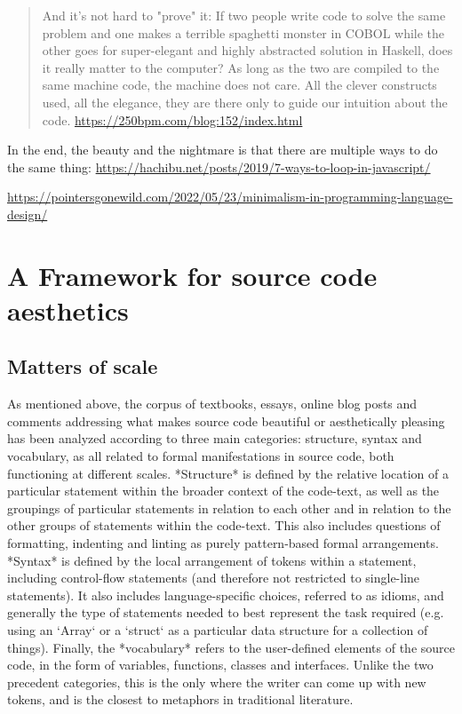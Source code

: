 \begin{quote}
    And it's not hard to "prove" it: If two people write code to solve the same problem and one makes a terrible spaghetti monster in COBOL while the other goes for super-elegant and highly abstracted solution in Haskell, does it really matter to the computer? As long as the two are compiled to the same machine code, the machine does not care. All the clever constructs used, all the elegance, they are there only to guide our intuition about the code. \url{https://250bpm.com/blog:152/index.html}
\end{quote}

In the end, the beauty and the nightmare is that there are multiple ways to do the same thing: \url{https://hachibu.net/posts/2019/7-ways-to-loop-in-javascript/}

\url{https://pointersgonewild.com/2022/05/23/minimalism-in-programming-language-design/}

\section{A Framework for source code aesthetics}
\label{sec:programming-aesthetic-framework}

\subsection{Matters of scale}
\label{subsec:matters-of-scale}

As mentioned above, the corpus of textbooks, essays, online blog posts and comments addressing what makes source code beautiful or aesthetically pleasing has been analyzed according to three main categories: structure, syntax and vocabulary, as all related to formal manifestations in source code, both functioning at different scales. *Structure* is defined by the relative location of a particular statement within the broader context of the code-text, as well as the groupings of particular statements in relation to each other and in relation to the other groups of statements within the code-text. This also includes questions of formatting, indenting and linting as purely pattern-based formal arrangements. *Syntax* is defined by the local arrangement of tokens within a statement, including control-flow statements (and therefore not restricted to single-line statements). It also includes language-specific choices, referred to as idioms, and generally the type of statements needed to best represent the task required (e.g. using an `Array` or a `struct` as a particular data structure for a collection of things). Finally, the *vocabulary* refers to the user-defined elements of the source code, in the form of variables, functions, classes and interfaces. Unlike the two precedent categories, this is the only where the writer can come up with new tokens, and is the closest to metaphors in traditional literature.

